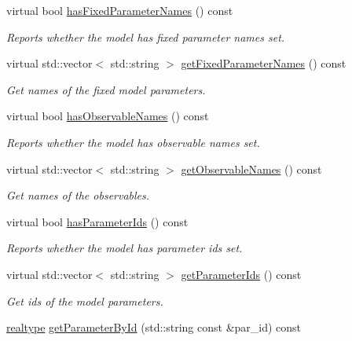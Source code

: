 \begin{DoxyCompactItemize}
virtual bool \mbox{\hyperlink{classamici_1_1_model_a964e924a1fe271f88bac4cfa909e2879}{has\+Fixed\+Parameter\+Names}} () const
\begin{DoxyCompactList}\small\item\em Reports whether the model has fixed parameter names set. \end{DoxyCompactList}\item 
virtual std\+::vector$<$ std\+::string $>$ \mbox{\hyperlink{classamici_1_1_model_a40260fd33966dc70d0edfa21bf655012}{get\+Fixed\+Parameter\+Names}} () const
\begin{DoxyCompactList}\small\item\em Get names of the fixed model parameters. \end{DoxyCompactList}\item 
virtual bool \mbox{\hyperlink{classamici_1_1_model_aa7b808394713a29e59c434dd7f6a23ac}{has\+Observable\+Names}} () const
\begin{DoxyCompactList}\small\item\em Reports whether the model has observable names set. \end{DoxyCompactList}\item 
virtual std\+::vector$<$ std\+::string $>$ \mbox{\hyperlink{classamici_1_1_model_a32b4a0c822a696e388aaa8284bf08059}{get\+Observable\+Names}} () const
\begin{DoxyCompactList}\small\item\em Get names of the observables. \end{DoxyCompactList}\item 
virtual bool \mbox{\hyperlink{classamici_1_1_model_a216de46b6ca89c0bcc4f1c1418d2c06a}{has\+Parameter\+Ids}} () const
\begin{DoxyCompactList}\small\item\em Reports whether the model has parameter ids set. \end{DoxyCompactList}\item 
virtual std\+::vector$<$ std\+::string $>$ \mbox{\hyperlink{classamici_1_1_model_ad5647cbe7c4989a7692955cbdbf5b3cd}{get\+Parameter\+Ids}} () const
\begin{DoxyCompactList}\small\item\em Get ids of the model parameters. \end{DoxyCompactList}\item 
\mbox{\hyperlink{namespaceamici_a1bdce28051d6a53868f7ccbf5f2c14a3}{realtype}} \mbox{\hyperlink{classamici_1_1_model_a4436bd89ae2cb032cbf13db478d99e15}{get\+Parameter\+By\+Id}} (std\+::string const \&par\+\_\+id) const

\end{DoxyCompactItemize}
